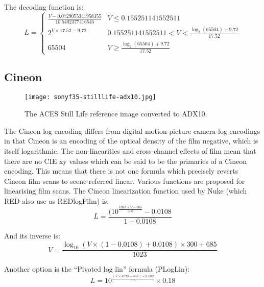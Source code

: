 The decoding function is:
\begin{equation}
    L =
    \begin{cases}
        \frac{V - 0.0729055341958355}{10.5402377416545} & V \leq 0.155251141552511 \\
        2^{V \times 17.52 - 9.72} & 0.155251141552511 < V < \frac{\log _2(65504) + 9.72}{17.52} \\
        65504 & V \geq \frac{\log _2(65504) + 9.72}{17.52}
    \end{cases}
\end{equation}

\subsection{Cineon}%
\label{subsec:cineon}

\begin{figure}[H]
    \texttt{[image: sonyf35-stilllife-adx10.jpg]}
    \caption{
        The ACES Still Life reference image converted to ADX10.\newline
        \ccCopyrightAmpas
    }%
    \label{fig:stilllife-adx10}
\end{figure}

The Cineon log encoding differs from digital motion-picture camera log encodings in that Cineon is an encoding of the optical density of the film negative, which is itself logarithmic.
The non-linearities and cross-channel effects of film mean that there are no CIE xy values which can be said to be the primaries of a Cineon encoding.
This means that there is not one formula which precisely reverts Cineon film scans to scene-referred linear.
Various functions are proposed for linearising film scans.
\ccPar{}
The Cineon linearization function used by Nuke (which RED also use as REDlogFilm) is:
\begin{equation}
    L = \frac{(10^{\frac{1023 \times V - 685}{300}} - 0.0108}{1 - 0.0108}
\end{equation}

\begin{figure}[H]
    \label{fig:cineon}
\end{figure}

And its inverse is:
\begin{equation}
    V = \frac{\log _{10}(V \times (1 - 0.0108) + 0.0108) \times 300 + 685}{1023}
\end{equation}

Another option is the ``Pivoted log lin'' formula (PLogLin):
\begin{equation}
    L = 10^{\frac{(V \times 1023 - 445) \times 0.002}{0.6}} \times 0.18
\end{equation}

